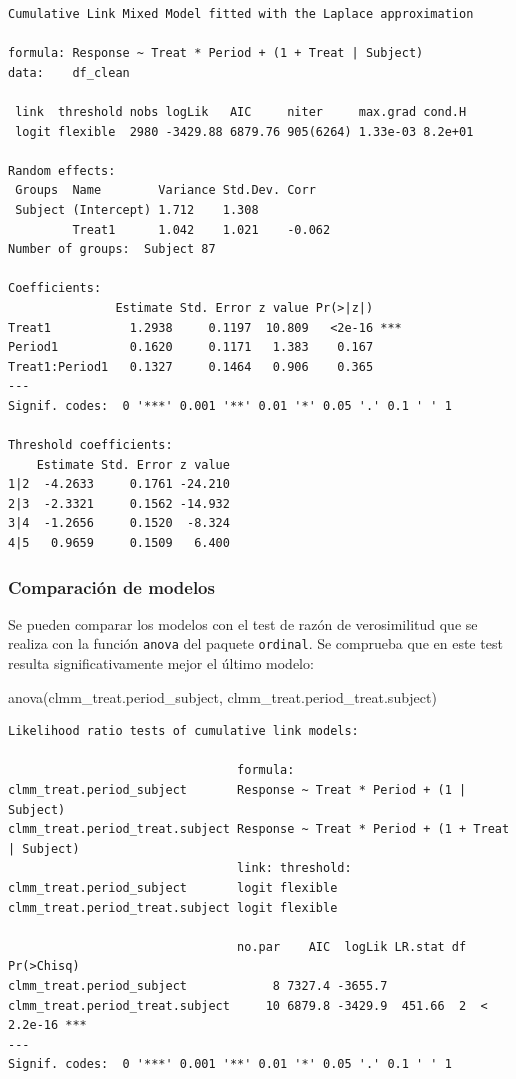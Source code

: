 \documentclass[
  12pt,
  a4paper,
  extrafontsizes,
  onecolumn,
  openright,
  table]{memoir}
\newenvironment{Shaded}{\begin{snugshade}}{\end{snugshade}}
\newcommand{\FunctionTok}[1]{\textcolor[rgb]{0.28,0.35,0.67}{#1}}
\newcommand{\NormalTok}[1]{\textcolor[rgb]{0.00,0.23,0.31}{#1}}
\begin{document}
\begin{verbatim}
Cumulative Link Mixed Model fitted with the Laplace approximation

formula: Response ~ Treat * Period + (1 + Treat | Subject)
data:    df_clean

 link  threshold nobs logLik   AIC     niter     max.grad cond.H 
 logit flexible  2980 -3429.88 6879.76 905(6264) 1.33e-03 8.2e+01

Random effects:
 Groups  Name        Variance Std.Dev. Corr   
 Subject (Intercept) 1.712    1.308           
         Treat1      1.042    1.021    -0.062 
Number of groups:  Subject 87 

Coefficients:
               Estimate Std. Error z value Pr(>|z|)    
Treat1           1.2938     0.1197  10.809   <2e-16 ***
Period1          0.1620     0.1171   1.383    0.167    
Treat1:Period1   0.1327     0.1464   0.906    0.365    
---
Signif. codes:  0 '***' 0.001 '**' 0.01 '*' 0.05 '.' 0.1 ' ' 1

Threshold coefficients:
    Estimate Std. Error z value
1|2  -4.2633     0.1761 -24.210
2|3  -2.3321     0.1562 -14.932
3|4  -1.2656     0.1520  -8.324
4|5   0.9659     0.1509   6.400
\end{verbatim}

\normalsize

\hypertarget{comparaciuxf3n-de-modelos}{%
\subsubsection{Comparación de modelos}\label{comparaciuxf3n-de-modelos}}

Se pueden comparar los modelos con el test de razón de verosimilitud que
se realiza con la función \texttt{anova} del paquete \texttt{ordinal}.
Se comprueba que en este test resulta significativamente mejor el último
modelo:

\scriptsize

\begin{Shaded}
\begin{Highlighting}[]
\FunctionTok{anova}\NormalTok{(clmm\_treat.period\_subject, clmm\_treat.period\_treat.subject)}
\end{Highlighting}
\end{Shaded}

\begin{verbatim}
Likelihood ratio tests of cumulative link models:
 
                                formula:                                         
clmm_treat.period_subject       Response ~ Treat * Period + (1 | Subject)        
clmm_treat.period_treat.subject Response ~ Treat * Period + (1 + Treat | Subject)
                                link: threshold:
clmm_treat.period_subject       logit flexible  
clmm_treat.period_treat.subject logit flexible  

                                no.par    AIC  logLik LR.stat df Pr(>Chisq)    
clmm_treat.period_subject            8 7327.4 -3655.7                          
clmm_treat.period_treat.subject     10 6879.8 -3429.9  451.66  2  < 2.2e-16 ***
---
Signif. codes:  0 '***' 0.001 '**' 0.01 '*' 0.05 '.' 0.1 ' ' 1
\end{verbatim}
\end{document}
